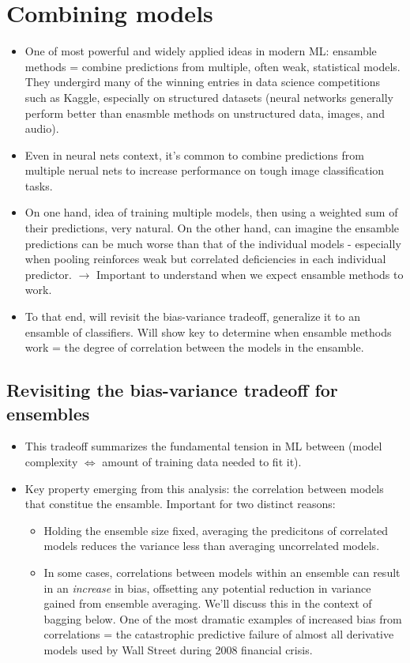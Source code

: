 \documentclass[norsk,a4paper,11pt]{article}
\begin{document}
\section{Combining models}
\begin{itemize}
	\item One of most powerful and widely applied ideas in modern ML: ensamble methods = combine predictions from multiple, often weak, statistical models. They undergird many of the winning entries in data science competitions such as Kaggle, especially on structured datasets (neural networks generally perform better than enasmble methods on unstructured data, images, and audio).
	\item Even in neural nets context, it's common to combine predictions from multiple nerual nets to increase performance on tough image classification tasks.
	\item On one hand, idea of training multiple models, then using a weighted sum of their predictions, very natural. On the other hand, can imagine the ensamble predictions can be much worse than that of the individual models - especially when pooling reinforces weak but correlated deficiencies in each individual predictor. $\rightarrow$ Important to understand when we expect ensamble methods to work.
	\item To that end, will revisit the bias-variance tradeoff, generalize it to an ensamble of classifiers. Will show key to determine when ensamble methods work = the degree of correlation between the models in the ensamble.
\end{itemize}

\subsection{Revisiting the bias-variance tradeoff for ensembles}
\begin{itemize}
	\item This tradeoff summarizes the fundamental tension in ML between (model complexity $\Leftrightarrow$ amount of training data needed to fit it).
	\item Key property emerging from this analysis: the correlation between models that constitue the ensamble. Important for two distinct reasons:
	\begin{itemize}
		\item  Holding the ensemble size fixed, averaging the predicitons of correlated models reduces the variance less than averaging uncorrelated models.
		\item In some cases, correlations between models within an ensemble can result in an \textit{increase} in bias, offsetting any potential reduction in variance gained from ensemble averaging. We'll discuss this in the context of bagging below. One of the most dramatic examples of increased bias from correlations = the catastrophic predictive failure of almost all derivative models used by Wall Street during 2008 financial crisis.
	\end{itemize}
\end{itemize}
\end{document}
